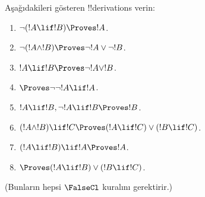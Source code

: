 \documentclass[../../../include/open-logic-section]{subfiles}
\begin{document}
\begin{prob}
Aşağıdakileri gösteren !!{derivation}s verin:
\begin{enumerate}
\item $\lnot(!A \lif !B) \Proves !A$.
\item $\lnot(!A \land !B) \Proves \lnot !A \lor \lnot !B$.
\item $!A \lif !B \Proves \lnot !A \lor !B$.
\item $\Proves \lnot \lnot !A \lif !A$.
\item $!A \lif !B, \lnot !A \lif !B \Proves !B$.
\item $(!A \land !B) \lif !C \Proves (!A \lif !C) \lor (!B \lif !C)$.
\item $(!A \lif !B) \lif !A \Proves !A$.
\item $\Proves (!A \lif !B) \lor (!B \lif !C)$.
\end{enumerate}
(Bunların hepsi $\FalseCl$ kuralını gerektirir.)
\end{prob}
\end{document}
